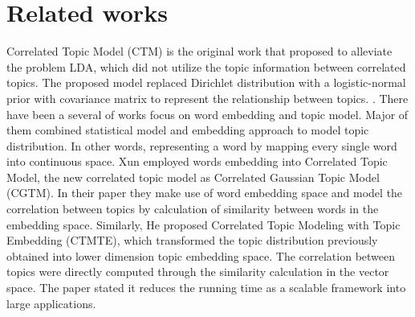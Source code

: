 \section{Related works}
Correlated Topic Model (CTM)\cite{blei_correlated_2007} is the original work that proposed to alleviate the problem LDA, which did not utilize the topic information between correlated topics. The proposed model replaced Dirichlet distribution with a logistic-normal prior with covariance matrix to represent the relationship between topics.
\cite{dieng_topic_2020}. There have been a several of works focus on word embedding and topic model. Major of them combined statistical model and embedding approach to model topic distribution. In other words, representing a word by mapping every single word into continuous space.
Xun \cite{xun_correlated_2017} employed words embedding into Correlated Topic Model, the new correlated topic model as Correlated Gaussian Topic Model (CGTM). In their paper they make use of word embedding space and model the correlation between topics by calculation of similarity between words in the embedding space.
Similarly, He\cite{he_efficient_2017} proposed Correlated Topic Modeling with Topic Embedding (CTMTE), which transformed the topic distribution previously obtained into lower dimension topic embedding space. The correlation between topics were directly computed through the similarity calculation in the vector space. The paper stated it reduces the running time as a scalable framework into large applications.

